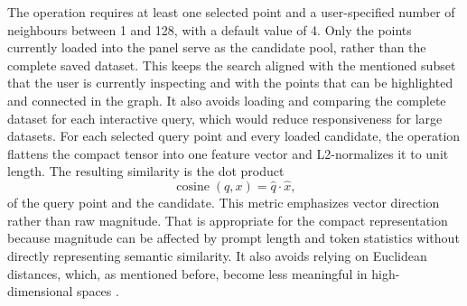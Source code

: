 The operation requires at least one selected point and a user-specified number of neighbours between 1 and 128, with a default value of 4. Only the points currently loaded into the panel serve as the candidate pool, rather than the complete saved dataset. This keeps the search aligned with the mentioned subset that the user is currently inspecting and with the points that can be highlighted and connected in the graph. It also avoids loading and comparing the complete dataset for each interactive query, which would reduce responsiveness for large datasets. For each selected query point and every loaded candidate, the operation flattens the compact tensor into one feature vector and L2-normalizes it to unit length. The resulting similarity is the dot product
\[
\operatorname{cosine}(q, x) = \hat{q} \cdot \hat{x},
\]
of the query point and the candidate. This metric emphasizes vector direction rather than raw magnitude. That is appropriate for the compact representation because magnitude can be affected by prompt length and token statistics without directly representing semantic similarity. It also avoids relying on Euclidean distances, which, as mentioned before, become less meaningful in high-dimensional spaces \cite{aggarwal2001distancemetrics}.

